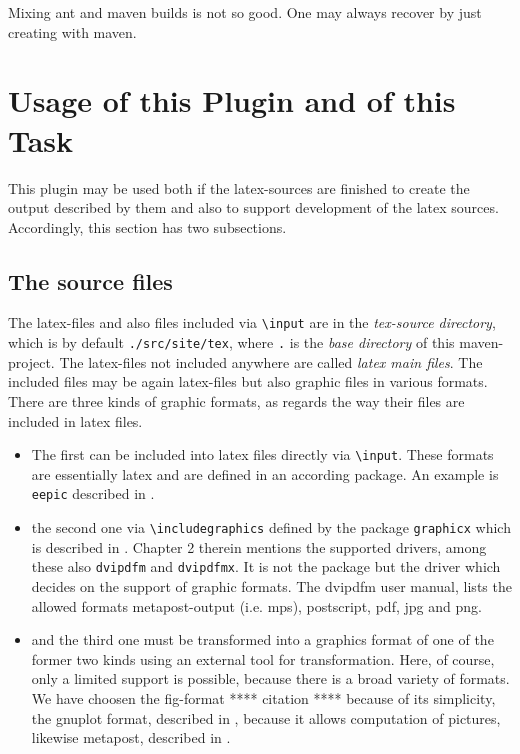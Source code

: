 \documentclass[12pt]{article}
\begin{document}
Mixing ant and maven builds is not so good. 
One may always recover by just creating with maven. 



\section{Usage of this Plugin and of this Task}\label{sec:usage}

This plugin may be used both if the latex-sources are finished 
to create the output described by them 
and also to support development of the latex sources. 
Accordingly, this section has two subsections. 

\subsection{The source files}\label{subsec:sources}

The latex-files and also files included via {\tt\textbackslash input} 
are in the {\em tex-source directory}, 
which is by default {\tt./src/site/tex}, 
where {\tt.} is the {\em base directory} of this maven-project. 
The latex-files not included anywhere are called {\em latex main files}. 
The included files may be again latex-files but also graphic files 
in various formats. 
There are three kinds of graphic formats, 
as regards the way their files are included in latex files. 
%
\begin{itemize}
\item
The first can be included into latex files directly 
via {\tt\textbackslash input}. 
These formats are essentially latex and are defined in an according package. 
An example is {\tt eepic} described in \cite{EEpic}. 
\item
the second one via {\tt\textbackslash includegraphics} 
defined by the package {\tt graphicx} 
which is described in \cite{GraX}. 
Chapter 2 therein mentions the supported drivers, 
among these also {\tt dvipdfm} and {\tt dvipdfmx}. 
It is not the package but the driver 
which decides on the support of graphic formats. 
The dvipdfm user manual, \cite{DviPdfMx} lists the allowed formats 
metapost-output (i.e. \gls{mps}), postscript, 
\gls{pdf}, \gls{jpg} and \gls{png}. 
\item
and the third one must be transformed into a graphics format 
of one of the former two kinds using an external tool for transformation. 
Here, of course, only a limited support is possible, 
because there is a broad variety of formats. 
We have choosen the \gls{fig}-format **** citation **** because of its simplicity, 
the gnuplot format, described in \cite{GnuPlot}, 
because it allows computation of pictures, 
likewise metapost, described in \cite{MPost}. 
\end{itemize}
\end{document}
